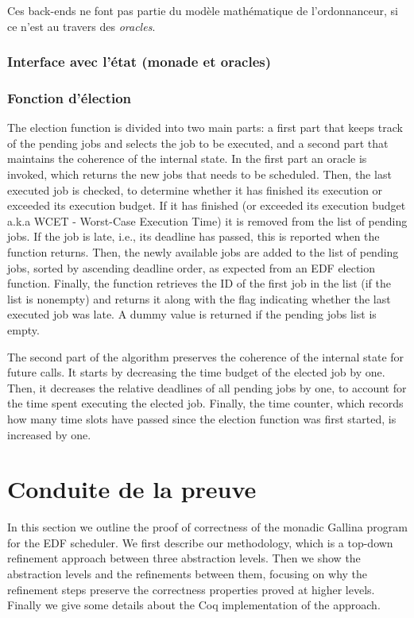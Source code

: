 			Ces back-ends ne font pas partie du modèle mathématique de l'ordonnanceur, si ce n'est au travers des \emph{oracles}.




			\subsubsection{Interface avec l'état (monade et oracles)}


			\subsubsection{Fonction d'élection}

			The election function is divided into two main parts: a first part that keeps track of the pending jobs and selects the job to be executed, and a second part that maintains the coherence of the internal state. In the first part an oracle is invoked, which returns the new jobs that needs to be scheduled. Then, the last executed job is checked, to determine whether it has finished its execution or exceeded its execution budget. If it has finished (or exceeded its execution budget a.k.a WCET - Worst-Case Execution Time) it is removed from the list of pending jobs. If the job is late, i.e., its deadline has passed, this is reported when the function returns. Then, the newly available jobs are added to the list of pending jobs, sorted by ascending deadline order, as expected from an EDF election function. Finally, the function retrieves the ID of the first job in the list (if the list is nonempty) and returns it along with the flag indicating whether the last executed job was late. A dummy value is returned if the pending jobs list is empty.

			The second part of the algorithm preserves the coherence of the internal state for future calls. It starts by decreasing the time budget of the elected job by one. Then, it decreases the relative deadlines of all pending jobs by one, to account for the time spent executing the elected job. Finally, the time counter, which records how many time slots have passed since the election function was first started, is increased by one.


	\section{Conduite de la preuve}

	\label{sec:proof}
	In this section we outline the proof of correctness of the monadic Gallina program for the EDF scheduler.
	We first describe our methodology, which is a top-down refinement approach between three abstraction levels. Then we show the abstraction levels and the refinements between them, focusing on why the refinement steps preserve the correctness properties proved at higher levels. Finally we give some details about the Coq implementation of the approach.


